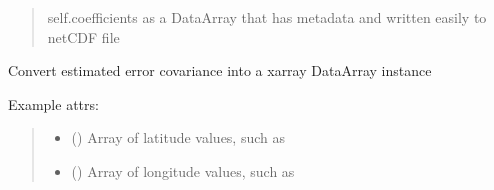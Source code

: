\documentclass[letterpaper,10pt,english]{sphinxmanual}
\begin{document}
\begin{fulllineitems}
\begin{fulllineitems}
\begin{quote}
\begin{description}
\begin{itemize}
\end{itemize}

\sphinxAtStartPar
{} \textendash{} self.coefficients as a DataArray that has metadata and
written easily to netCDF file

\sphinxAtStartPar
{}

\end{description}\end{quote}

\end{fulllineitems}


\begin{fulllineitems}
\label{\detokenize{kalman:glomar_gridding.autocorrelation.LassoEstimate_AR1.to_xarray_da_errcov}}
\pysigstartsignatures
\pysiglinewithargsret
{}
{\sphinxparamcomma {}\sphinxparamcomma {}\sphinxparamcomma {}}
{}
\pysigstopsignatures
\sphinxAtStartPar
Convert estimated error covariance into a xarray DataArray instance

\sphinxAtStartPar
Example attrs:
\begin{quote}\begin{description}
\begin{itemize}
\item {}
\sphinxAtStartPar
{} () \textendash{} Array of latitude values, such as 

\item {}
\sphinxAtStartPar
{} () \textendash{} Array of longitude values, such as 


\end{itemize}
\end{description}
\end{quote}
\end{fulllineitems}
\end{fulllineitems}
\end{document}
